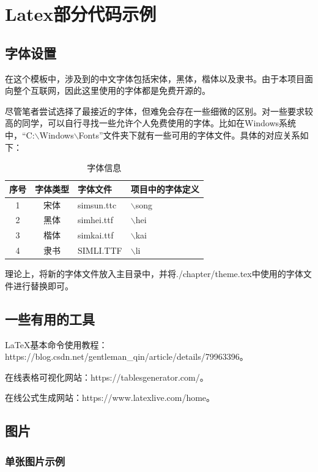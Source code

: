 \thispagestyle{main}
\chapter{Latex部分代码示例}
\thispagestyle{main}


\section{字体设置}

在这个模板中，涉及到的中文字体包括宋体，黑体，楷体以及隶书。由于本项目面向整个互联网，因此这里使用的字体都是免费开源的。

尽管笔者尝试选择了最接近的字体，但难免会存在一些细微的区别。对一些要求较高的同学，可以自行寻找一些允许个人免费使用的字体。比如在Windows系统中，``C:$\backslash$Windows$\backslash$Fonts''文件夹下就有一些可用的字体文件。具体的对应关系如下：
\begin{table}[!ht]
\centering
\caption{字体信息}
\begin{tabular}{ccll}
    \toprule
    序号 & 字体类型 & 字体文件       & 项目中的字体定义  \\
    \midrule
    1   & 宋体    & simsun.ttc    & $\backslash$song  \\
    2   & 黑体    & simhei.ttf    & $\backslash$hei   \\
    3   & 楷体    & simkai.ttf    & $\backslash$kai   \\
    4   & 隶书    & SIMLI.TTF     & $\backslash$li    \\
    \bottomrule
\end{tabular}
\end{table}
理论上，将新的字体文件放入主目录中，并将./chapter/theme.tex中使用的字体文件进行替换即可。


\section{一些有用的工具}

LaTeX基本命令使用教程：https://blog.csdn.net/gentleman\_qin/article/details/79963396。

在线表格可视化网站：https://tablesgenerator.com/。

在线公式生成网站：https://www.latexlive.com/home。


\section{图片}

\subsection{单张图片示例}

